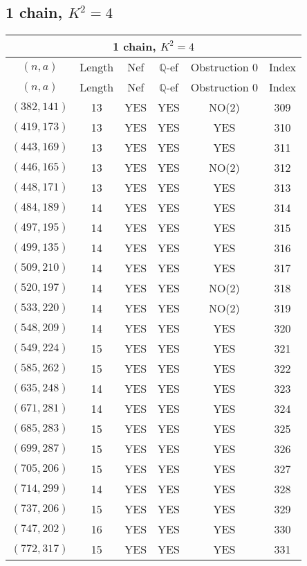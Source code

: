 \subsection{1 chain, $K^2 = 4$}
\begin{longtable}{|c|c|c|c|c|c|}
\hline
\multicolumn{6}{|c|}{1 chain, $K^2 = 4$}\\
\hline
$(n,a)$ & Length & Nef & $\mathbb Q$-ef & Obstruction 0 & Index\\
\hline
\endfirsthead

\hline
$(n,a)$ & Length & Nef & $\mathbb Q$-ef & Obstruction 0 & Index\\
\hline
\endhead
\hline
\endfoot

$(382, 141)$ & 13 & YES & YES & NO(2) & 309\\
$(419, 173)$ & 13 & YES & YES & YES & 310\\
$(443, 169)$ & 13 & YES & YES & YES & 311\\
$(446, 165)$ & 13 & YES & YES & NO(2) & 312\\
$(448, 171)$ & 13 & YES & YES & YES & 313\\
$(484, 189)$ & 14 & YES & YES & YES & 314\\
$(497, 195)$ & 14 & YES & YES & YES & 315\\
$(499, 135)$ & 14 & YES & YES & YES & 316\\
$(509, 210)$ & 14 & YES & YES & YES & 317\\
$(520, 197)$ & 14 & YES & YES & NO(2) & 318\\
$(533, 220)$ & 14 & YES & YES & NO(2) & 319\\
$(548, 209)$ & 14 & YES & YES & YES & 320\\
$(549, 224)$ & 15 & YES & YES & YES & 321\\
$(585, 262)$ & 15 & YES & YES & YES & 322\\
$(635, 248)$ & 14 & YES & YES & YES & 323\\
$(671, 281)$ & 14 & YES & YES & YES & 324\\
$(685, 283)$ & 15 & YES & YES & YES & 325\\
$(699, 287)$ & 15 & YES & YES & YES & 326\\
$(705, 206)$ & 15 & YES & YES & YES & 327\\
$(714, 299)$ & 14 & YES & YES & YES & 328\\
$(737, 206)$ & 15 & YES & YES & YES & 329\\
$(747, 202)$ & 16 & YES & YES & YES & 330\\
$(772, 317)$ & 15 & YES & YES & YES & 331\\

\end{longtable}
